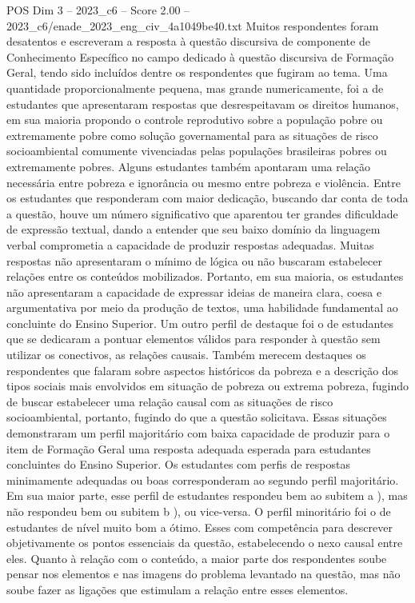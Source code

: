 \begin{textsample}{POS Dim 3 – 2023\_c6 – Score 2.00 – 2023\_c6/enade\_2023\_eng\_civ\_4a1049be40.txt}
Muitos respondentes foram desatentos e escreveram a resposta à questão discursiva de componente de Conhecimento Específico no campo dedicado à questão discursiva de Formação Geral, tendo sido incluídos dentre os respondentes que fugiram ao tema.
Uma quantidade proporcionalmente pequena, mas grande numericamente, foi a de estudantes que apresentaram respostas que desrespeitavam os direitos humanos, em sua maioria propondo o controle reprodutivo sobre a população pobre ou extremamente pobre como solução governamental para as situações de risco socioambiental comumente vivenciadas pelas populações brasileiras pobres ou extremamente pobres.
Alguns estudantes também apontaram uma relação necessária entre pobreza e ignorância ou mesmo entre pobreza e violência.
Entre os estudantes que responderam com maior dedicação, buscando dar conta de toda a questão, houve um número significativo que aparentou ter grandes dificuldade de expressão textual, dando a entender que seu baixo domínio da linguagem verbal comprometia a capacidade de produzir respostas adequadas.
Muitas respostas não apresentaram o mínimo de lógica ou não buscaram estabelecer relações entre os conteúdos mobilizados.
Portanto, em sua maioria, os estudantes não apresentaram a capacidade de expressar ideias de maneira clara, coesa e argumentativa por meio da produção de textos, uma habilidade fundamental ao concluinte do Ensino Superior.
Um outro perfil de destaque foi o de estudantes que se dedicaram a pontuar elementos válidos para responder à questão sem utilizar os conectivos, as relações causais.
Também merecem destaques os respondentes que falaram sobre aspectos históricos da pobreza e a descrição dos tipos sociais mais envolvidos em situação de pobreza ou extrema pobreza, fugindo de buscar estabelecer uma relação causal com as situações de risco socioambiental, portanto, fugindo do que a questão solicitava.
Essas situações demonstraram um perfil majoritário com baixa capacidade de produzir para o item de Formação Geral uma resposta adequada esperada para estudantes concluintes do Ensino Superior.
Os estudantes com perfis de respostas minimamente adequadas ou boas corresponderam ao segundo perfil majoritário.
Em sua maior parte, esse perfil de estudantes respondeu bem ao subitem a ), mas não respondeu bem ou subitem b ), ou vice-versa.
O perfil minoritário foi o de estudantes de nível muito bom a ótimo.
Esses com competência para descrever objetivamente os pontos essenciais da questão, estabelecendo o nexo causal entre eles.
Quanto à relação com o conteúdo, a maior parte dos respondentes soube pensar nos elementos e nas imagens do problema levantado na questão, mas não soube fazer as ligações que estimulam a relação entre esses elementos.

\end{textsample}
